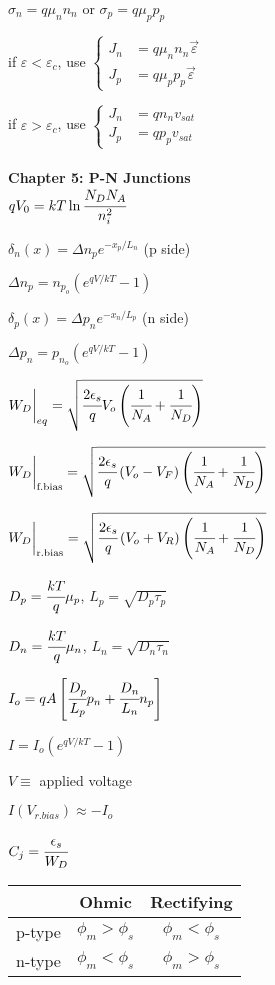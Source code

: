 \documentclass{article}
\newcommand{\sect}[1]{\noindent\textbf{#1}\\}
\begin{document}
{\begin{multicols*}{2}
		\noindent $\sigma_n = q\mu_nn_n$ or $\sigma_p = q\mu_pp_p$
		
		\noindent if $\varepsilon < \varepsilon_c$, use $\left\{\begin{aligned} J_n &= q\mu_nn_n\vec{\varepsilon} \\ J_p &= q\mu_pp_p\vec{\varepsilon}\end{aligned}\right.$
		
		\noindent if $\varepsilon > \varepsilon_c$, use $\left\{\begin{aligned}
		J_n &= qn_nv_{sat} \\ J_p &= qp_pv_{sat}
		\end{aligned}\right.$\\\\
		
		\sect{Chapter 5: P-N Junctions}
		$qV_0 = kT\ln\cfrac{N_DN_A}{n_i^2}$
		
		\noindent $\delta_n(x) = \Delta n_p e^{-x_p/L_n}$ (p side)
		
		\noindent $\Delta n_p = n_{p_o}\left(e^{qV/kT}-1\right)$
		
		\noindent $\delta_p(x) = \Delta p_n e^{-x_n/L_p}$ (n side)
		
		\noindent $\Delta p_n = p_{n_o}\left(e^{qV/kT}-1\right)$
		
		\noindent $W_D \biggr\rvert_{eq} = \sqrt{\cfrac{2\epsilon_s}{q} V_o \left(\cfrac{1}{N_A} + \cfrac{1}{N_D}\right)}$
		
		\noindent $W_D \biggr\rvert_{\text{f.bias}} = \sqrt{\cfrac{2\epsilon_s}{q} \left(V_o-V_F\right) \left(\cfrac{1}{N_A} + \cfrac{1}{N_D}\right)}$
		
		\noindent $W_D \biggr\rvert_{\text{r.bias}} = \sqrt{\cfrac{2\epsilon_s}{q} \left(V_o+V_R\right) \left(\cfrac{1}{N_A} + \cfrac{1}{N_D}\right)}$
		
		\noindent $D_p = \cfrac{kT}{q}\mu_p$, $L_p = \sqrt{D_p \tau_p}$
		
		\noindent $D_n = \cfrac{kT}{q}\mu_n$, $L_n = \sqrt{D_n \tau_n}$
		
		\noindent $I_o = qA\left[ \cfrac{D_p}{L_p} p_n + \cfrac{D_n}{L_n} n_p\right]$
		
		\noindent $I = I_o \left( e^{qV/kT} - 1 \right)$
		
		\noindent $V \equiv $ applied voltage
		
		\noindent $I(V_{r.bias}) \approx -I_o$
		
		\noindent $C_j = \cfrac{\epsilon_s}{W_D}$
		
		\noindent\begin{tabular}{c|c|c|}
			& Ohmic & Rectifying \\ \hline
			p-type & $\phi_m > \phi_s$ & $\phi_m < \phi_s$ \\
			n-type & $\phi_m < \phi_s$ & $\phi_m > \phi_s$ \\
		\end{tabular}
		\vfill\null
		\columnbreak
	

\end{multicols*}}
\end{document}
